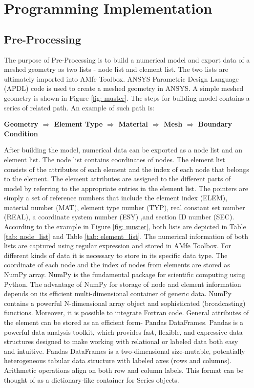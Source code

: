 \chapter{Programming Implementation}
\section{Pre-Processing}
The purpose of Pre-Processing is to build a numerical model and export data of a meshed geometry as two lists - node list and element list.  The two lists are ultimately imported into AMfe Toolbox. ANSYS Parametric Design Language (APDL) code is used to create a meshed geometry in ANSYS. A simple meshed geometry is shown in Figure \ref{fig: muster}. The steps for building model contains a series of related path. An example of such path is: 

\begin{center}
	\large{\textbf{Geometry $\Rightarrow$ Element Type $\Rightarrow$ Material $\Rightarrow$ Mesh
			$\Rightarrow$ Boundary Condition  }}
\end{center}

After building the model, numerical data can be exported as a node list and an element list. The node list contains coordinates of nodes. The element list consists of the attributes of each element and the index of each node that belongs to the element. The element attributes are assigned to the different parts of model by referring to the appropriate entries in the element list. The pointers are simply a set of reference numbers that include  the element index (ELEM), material number (MAT), element type number (TYP), real constant set number (REAL), a coordinate system number (ESY) ,and section ID number (SEC). According to the example in Figure \ref{fig: muster}, both lists are depicted in Table \ref{tab: node_list} and Table \ref{tab: element_list}. The numerical information of both lists are captured using regular expression and stored in AMfe Toolbox. For different kinds of data it is necessary to store in its specific data type. The coordinate of each node and the index of nodes from elements are stored as NumPy array. NumPy is the fundamental package for scientific computing using Python. The advantage of NumPy for storage of node and element information depends on its efficient multi-dimensional container of generic data. NumPy contains a powerful N-dimensional array object and sophisticated (broadcasting) functions. Moreover, it is possible to integrate Fortran code. General attributes of the element can be stored as an efficient form- Pandas DataFrames. Pandas is a powerful data analysis toolkit, which provides fast, flexible, and expressive data structures designed to make working with relational or labeled data both easy and intuitive. Pandas DataFrames is a two-dimensional size-mutable, potentially heterogeneous tabular data structure with labeled axes (rows and columns). Arithmetic operations align on both row and column labels. This format can be thought of as a dictionary-like container for Series objects. 

